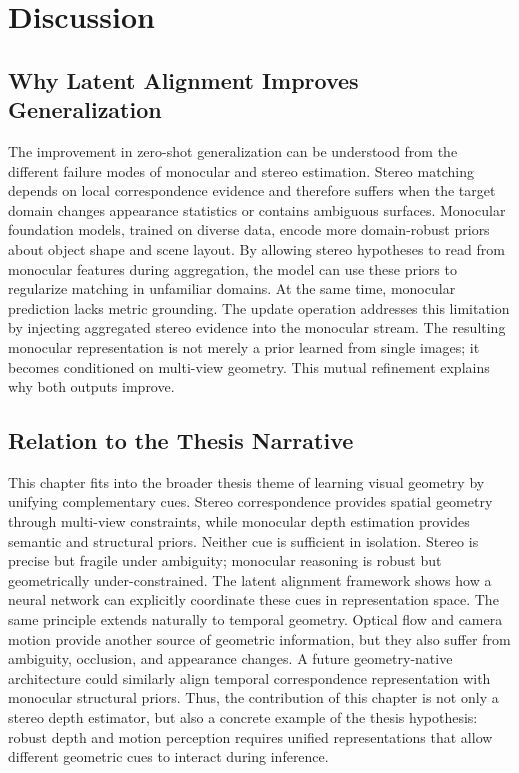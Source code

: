 \section{Discussion}
\subsection{Why Latent Alignment Improves Generalization}
The improvement in zero-shot generalization can be understood from the different failure modes of monocular and stereo estimation.
Stereo matching depends on local correspondence evidence and therefore suffers when the target domain changes appearance statistics or contains ambiguous surfaces.
Monocular foundation models, trained on diverse data, encode more domain-robust priors about object shape and scene layout.
By allowing stereo hypotheses to read from monocular features during aggregation, the model can use these priors to regularize matching in unfamiliar domains.
At the same time, monocular prediction lacks metric grounding.
The update operation addresses this limitation by injecting aggregated stereo evidence into the monocular stream.
The resulting monocular representation is not merely a prior learned from single images; it becomes conditioned on multi-view geometry.
This mutual refinement explains why both outputs improve.

\subsection{Relation to the Thesis Narrative}
This chapter fits into the broader thesis theme of learning visual geometry by unifying complementary cues.
Stereo correspondence provides spatial geometry through multi-view constraints, while monocular depth estimation provides semantic and structural priors.
Neither cue is sufficient in isolation.
Stereo is precise but fragile under ambiguity; monocular reasoning is robust but geometrically under-constrained.
The latent alignment framework shows how a neural network can explicitly coordinate these cues in representation space.
The same principle extends naturally to temporal geometry.
Optical flow and camera motion provide another source of geometric information, but they also suffer from ambiguity, occlusion, and appearance changes.
A future geometry-native architecture could similarly align temporal correspondence representation with monocular structural priors.
Thus, the contribution of this chapter is not only a stereo depth estimator, but also a concrete example of the thesis hypothesis: robust depth and motion perception requires unified representations that allow different geometric cues to interact during inference.

